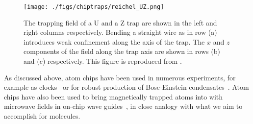 \begin{figure}
  \centering
  \texttt{[image: ./figs/chiptraps/reichel\_UZ.png]}
  \caption{
  The trapping field of a U and a Z trap are shown in the left and right
  columns respectively. Bending a straight wire as in row (a) introduces weak
  confinement along the axis of the trap.  The $x$ and $z$ components of the
  field along the trap axis are shown in rows (b) and (c) respectively. This
  figure is reproduced from . 
  }
  \label{intro:fig:reichel_UZ}
\end{figure}

As discussed above, atom chips have been used in numerous experiments, for
example as clocks~\cite{RAMIREZMARTINEZ2011247} or for robust production of
Bose-Einstein condensates~\cite{Ott2001}. Atom chips have also been used to
bring magnetically trapped atoms into with microwave fields in on-chip wave
guides~\cite{Treutlein2008}, in close analogy with what we aim to accomplish
for molecules. 
